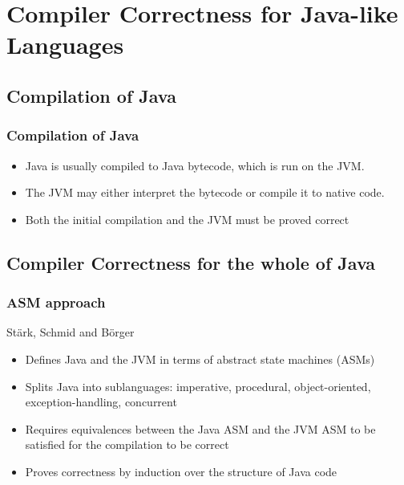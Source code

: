 \documentclass{beamer}
\newcommand{\footmake}[1]{
\ifthenelse{\equal{#1}{}}%
	{}%
	{\footnotetext{#1}}%
}
\newenvironment{slide}[2][fragile,environment=slide]
{\begin{frame}[#1]
	\frametitle{#2}\begin{refsegment}}
{\footmake{\printbibliography[segment=\therefsegment]}\end{refsegment}\end{frame}}
\begin{document}
\section{Compiler Correctness for Java-like Languages}

\frame{\sectionpage}

\subsection{Compilation of Java}

\begin{frame}
  \frametitle{Compilation of Java}
  \begin{itemize}
  \item Java is usually compiled to Java bytecode, which is run on the JVM.
  \item The JVM may either interpret the bytecode or compile it to native code.
  \item Both the initial compilation and the JVM must be proved correct
  \end{itemize}
  \begin{center}
  \end{center}
\end{frame}

\subsection{Compiler Correctness for the whole of Java}

\begin{slide}{ASM approach}
St\"{a}rk, Schmid and B\"orger\cite{stark2001}
\begin{itemize}
\item Defines Java and the JVM in terms of abstract state machines (ASMs)
\item Splits Java into sublanguages: imperative, procedural, object-oriented, exception-handling, concurrent
\item Requires equivalences between the Java ASM and the JVM ASM to be satisfied for the compilation to be correct
\item Proves correctness by induction over the structure of Java code
\end{itemize}
\end{slide}
\end{document}
